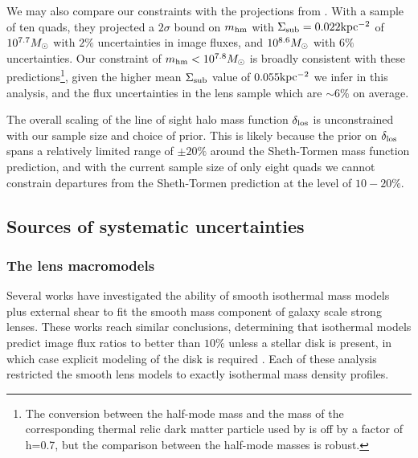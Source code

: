 We may also compare our constraints with the projections from  \citet{Gilman++19}. With a sample of ten quads, they projected a $2 \sigma$ bound on ${m_{\rm{hm}}}$ with $\Sigma_{\rm{sub}} = 0.022 \rm{kpc^{-2}}$ of $10^{7.7} {M_{\odot}}$ with $2\%$ uncertainties in image fluxes, and $10^{8.6} {M_{\odot}}$ with $6 \%$ uncertainties. Our constraint of ${m_{\rm{hm}}} < 10^{7.8} {M_{\odot}}$ is broadly consistent with these predictions\footnote{The conversion between the half-mode mass and the mass of the corresponding thermal relic dark matter particle used by \citet{Gilman++19} is off by a factor of h=0.7, but the comparison between the half-mode masses is robust.}, given the higher mean $\Sigma_{\rm{sub}}$ value of $0.055 \rm{kpc^{-2}}$ we infer in this analysis, and the flux uncertainties in the lens sample which are $\sim 6 \%$ on average. 

The overall scaling of the line of sight halo mass function $\delta_{\rm{los}}$ is unconstrained with our sample size and choice of prior. This is likely because the prior on $\delta_{\rm{los}}$ spans a relatively limited range of $\pm 20\%$ around the Sheth-Tormen mass function prediction, and with the current sample size of only eight quads we cannot constrain departures from the Sheth-Tormen prediction at the level of $10-20\%$. 

\subsection{Sources of systematic uncertainties}
\label{ssec:systematics}
\subsubsection{The lens macromodels}
Several works \citep{Gilman++17,Hsueh++18} have investigated the ability of smooth isothermal mass models plus external shear to fit the smooth mass component of galaxy scale strong lenses. These works reach similar conclusions, determining that isothermal models predict image flux ratios to better than $10 \%$ unless a stellar disk is present, in which case explicit modeling of the disk is required \citep[e.g.][]{Hsueh++17,Hsueh++18}. Each of these analysis restricted the smooth lens models to exactly isothermal mass density profiles. 

